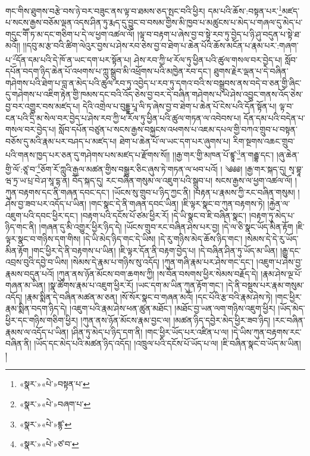 གང་གིས་ཐུགས་བརྩེ་བས་ཉེ་བར་བཟུང་ནས་ལྟ་བ་ཐམས་ཅད་སྤང་བའི་ཕྱིར། དམ་པའི་ཆོས་:བསྟན་པར་\footnote{«སྣར་»«པེ་»བསྟན་པ་}མཛད་པ་སངས་རྒྱས་བཅོམ་ལྡན་འདས་ཤིན་ཏུ་རྨད་དུ་བྱུང་བ་བསམ་གྱིས་མི་ཁྱབ་པ་མཚུངས་པ་མེད་པ་གཞལ་དུ་མེད་པ་གདུང་གཽ་ཏ་མ་དང་གཅིག་པ་དེ་ལ་ཕྱག་འཚལ་ལོ། །ལྟ་བ་བརྟག་པ་ཞེས་བྱ་བ་སྟེ་རབ་ཏུ་བྱེད་པ་ཉི་ཤུ་བདུན་པ་སྟེ་ཐ་མའོ།། །།དབུ་མ་རྩ་བའི་ཚིག་ལེའུར་བྱས་པ་ཤེས་རབ་ཅེས་བྱ་བ་ཐེག་པ་ཆེན་པོའི་ཆོས་མངོན་པ་རྣམ་པར་:གཞག་པ་\footnote{«སྣར་»«པེ་»བཞག་པ་}དོན་དམ་པའི་དེ་ཁོ་ན་ཡང་དག་པར་སྟོན་པ། ཤེས་རབ་ཀྱི་ཕ་རོལ་ཏུ་ཕྱིན་པའི་ཚུལ་གསལ་བར་བྱེད་པ། སློབ་དཔོན་བདག་ཉིད་ཆེན་པོ་འཕགས་པ་ཀླུ་སྒྲུབ་མི་འཕྲོགས་པའི་མཁྱེན་རབ་དང་། ཐུགས་རྗེར་ལྡན་པ་དེ་བཞིན་གཤེགས་པའི་ཐེག་པ་བླ་ན་མེད་པའི་ཚུལ་རབ་ཏུ་འབྱེད་པ་རབ་ཏུ་དགའ་བའི་ས་བསྒྲུབས་ནས་བདེ་བ་ཅན་གྱི་ཞིང་དུ་གཤེགས་པ་འཇིག་རྟེན་གྱི་ཁམས་དང་བའི་འོད་ཅེས་བྱ་བར་དེ་བཞིན་གཤེགས་པ་ཡེ་ཤེས་འབྱུང་གནས་འོད་ཅེས་བྱ་བར་འགྱུར་བས་མཛད་པ། དེའི་འགྲེལ་པ་བུདྡྷ་པཱ་ལི་ཏ་ཞེས་བྱ་བ་ཐེག་པ་ཆེན་པོ་ངེས་པའི་དོན་སྟོན་པ། ལྟ་བ་ངན་པའི་དྲི་མ་སེལ་བར་བྱེད་པ་ཤེས་རབ་ཀྱི་ཕ་རོལ་ཏུ་ཕྱིན་པའི་ཚུལ་གཏན་ལ་འབེབས་པ། དོན་དམ་པའི་བདེན་པ་གསལ་བར་བྱེད་པ། སློབ་དཔོན་བཙུན་པ་སངས་རྒྱས་བསྐྱངས་འཕགས་པ་འཇམ་དཔལ་གྱི་བཀའ་གྲུབ་པ་བསྟན་བཅོས་དུ་མའི་རྣམ་པར་བཤད་པ་མཛད་པ། ཐེག་པ་ཆེན་པོ་ལ་ཡང་དག་པར་ཞུགས་པ། རིག་སྔགས་འཆང་གྲུབ་པའི་གནས་ཁྱད་པར་ཅན་དུ་གཤེགས་པས་མཛད་པ་རྫོགས་སོ།། །།རྒྱ་གར་གྱི་མཁན་པོ་ཛྙཱ་\footnote{«སྣར་»«པེ་»ཛྙ་}ན་གརྦྷ་དང་། །ཞུ་ཆེན་གྱི་ལོ་:ཙཱ་བ་\footnote{«སྣར་»«པེ་»ཙ་བ་}ཅོག་རོ་ཀླུའི་རྒྱལ་མཚན་གྱིས་བསྒྱུར་ཅིང་ཞུས་ཏེ་གཏན་ལ་ཕབ་པའོ། ། ༄༅༅། །རྒྱ་གར་སྐད་དུ། སྭ་བྷཱ་ཝ་ཏྲ་ཡ་པྲ་བེ་ཤ་སཱ་དྷ་ན། བོད་སྐད་དུ། རང་བཞིན་གསུམ་ལ་འཇུག་པའི་སྒྲུབ་པ། སངས་རྒྱས་ལ་ཕྱག་འཚལ་ལོ། །ཀུན་བརྟགས་དང་ནི་གཞན་དབང་དང་། །ཡོངས་སུ་གྲུབ་པ་ཉིད་ཀྱང་ནི། །བརྟན་པ་རྣམས་ཀྱི་རང་བཞིན་གསུམ། །ཤེས་བྱ་ཟབ་པར་འདོད་པ་ཡིན། །གང་སྣང་དེ་ནི་གཞན་དབང་ཡིན། །ཇི་ལྟར་སྣང་བ་ཀུན་བརྟགས་ཏེ། །རྐྱེན་ལ་འཇུག་པའི་དབང་ཕྱིར་དང་། །བརྟག་པའི་དངོས་པོ་ཙམ་ཕྱིར་རོ། །དེ་ཡི་སྣང་བ་ཇི་བཞིན་སྣང་། །བརྟག་ཏུ་མེད་པ་ཉིད་གང་ནི། །གཞན་དུ་མི་འགྱུར་ཕྱིར་ཉིད་དེ། །ཡོངས་གྲུབ་རང་བཞིན་ཤེས་པར་བྱ། །དེ་ལ་ཅི་སྣང་ཡོད་མིན་རྟོག །ཇི་ལྟར་སྣང་བ་གཉིས་དག་གིས། །དེ་ཡི་མེད་ཉིད་གང་དེ་ཡིས། །དེ་རུ་གཉིས་མེད་ཆོས་ཉིད་གང་། །སེམས་དེ་དེ་རུ་ཡོད་མིན་རྟོག །གང་ཕྱིར་དེ་ནི་བརྟགས་པ་ཡིན། །ཇི་ལྟར་དོན་ནི་བརྟག་བྱེད་པ། །དེ་བཞིན་ཤིན་ཏུ་ཡོད་མ་ཡིན། །རྒྱུ་དང་འབྲས་བུའི་དབྱེ་བ་ཡིས། །སེམས་དེ་རྣམ་པ་གཉིས་སུ་འདོད། །ཀུན་གཞི་རྣམ་པར་ཤེས་གང་དང་། །འཇུག་པ་ཤེས་བྱ་རྣམས་བདུན་པའོ། །ཀུན་ནས་ཉོན་མོངས་བག་ཆགས་ཀྱི། །ས་བོན་བསགས་ཕྱིར་སེམས་བརྗོད་དེ། །རྣམ་ཤེས་ལྔ་པོ་གཞན་མ་ཡིན། །སྣ་ཚོགས་རྣམ་པ་འཇུག་ཕྱིར་རོ། །ཡང་དག་མ་ཡིན་ཀུན་རྟོག་གང་། །དེ་ནི་བསྡུས་པར་རྣམ་གསུམ་འདོད། །རྣམ་སྨིན་དེ་བཞིན་མཚན་མ་ཅན། །སོ་སོར་སྣང་བ་གཞན་མའོ། །དང་པོའི་རྩ་བའི་རྣམ་ཤེས་ཏེ། །གང་ཕྱིར་རྣམ་སྨིན་བདག་ཉིད་དེ། །འཇུག་པའི་རྣམ་ཤེས་ཕན་ཚུན་མཐོང་། །མཐོང་བྱ་ཡན་ལག་གཉིས་འཇུག་ཕྱིར། །ཡོད་མེད་ཕྱིར་དང་གཉིས་གཅིག་ཕྱིར། །ཀུན་ནས་ཉོན་མོངས་རྣམ་བྱང་ལ། །མཚན་ཉིད་དབྱེར་མེད་ཕྱིར་ཟབ་ཉིད། །རང་བཞིན་རྣམས་ལ་འདོད་པ་ཡིན། །ཤིན་ཏུ་མེད་པ་ཉིད་དག་ནི། །གང་ཕྱིར་ཡོད་པར་འཛིན་པ་ལ། །དེ་ཡིས་ཀུན་བརྟགས་རང་བཞིན་ནི། །ཡོད་དང་མེད་པའི་མཚན་ཉིད་འདོད། །འཁྲུལ་པའི་དངོས་པོ་ཡོད་པ་ལ། །ཇི་བཞིན་སྣང་བ་ཡོད་མ་ཡིན། །

